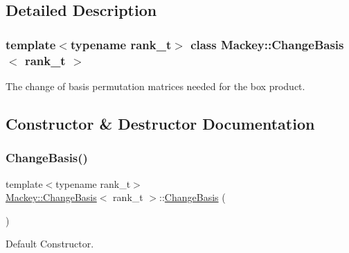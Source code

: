 \subsection{Detailed Description}
\subsubsection*{template$<$typename rank\+\_\+t$>$\newline
class Mackey\+::\+Change\+Basis$<$ rank\+\_\+t $>$}

The change of basis permutation matrices needed for the box product. 

\subsection{Constructor \& Destructor Documentation}
\mbox{\label{classMackey_1_1ChangeBasis_a7edd090a5261e776f8e0221541822a87}} 
\subsubsection{\texorpdfstring{Change\+Basis()}{ChangeBasis()}\hspace{0.1cm}{\footnotesize\ttfamily [1/2]}}
{\footnotesize\ttfamily template$<$typename rank\+\_\+t$>$ \\
\hyperlink{classMackey_1_1ChangeBasis}{Mackey\+::\+Change\+Basis}$<$ rank\+\_\+t $>$\+::\hyperlink{classMackey_1_1ChangeBasis}{Change\+Basis} (\begin{DoxyParamCaption}{ }\end{DoxyParamCaption})\hspace{0.3cm}{\ttfamily [inline]}}



Default Constructor. 

\mbox{\label{classMackey_1_1ChangeBasis_a036c1f54ffb4cf4115efa2fab60c354b}} 
